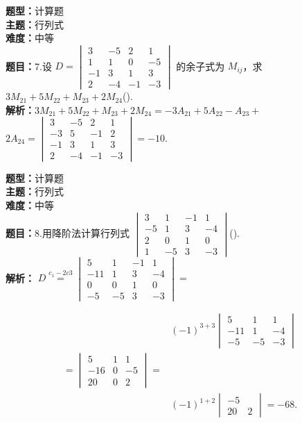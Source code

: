 \documentclass{ctexart}
\newenvironment{question}[5]{%
	\noindent\textbf{题型：}#1\\
	\textbf{主题：}#2\\
	\textbf{难度：}#3\\
	\textbf{题目：}#4\\
	\textbf{解析：}#5\\
	\vspace{1em}
}{}
\begin{document}
	\begin{question}
		{计算题}
		{行列式}
		{中等}
		{7.设 \(D=\begin{vmatrix}3 & -5 & 2 & 1 \\ 1 & 1 & 0 & -5 \\ -1 & 3 & 1 & 3 \\ 2 & -4 & -1 & -3\end{vmatrix}\) 的余子式为 \(M_{ij}\)，求 \(3 M_{21}+5 M_{22}+M_{23}+2 M_{24}\)(\qquad). }
		{\(3 M_{21}+5 M_{22}+M_{23}+2 M_{24}=-3 A_{21}+5 A_{22}-A_{23}+\) \(2 A_{24} =\begin{vmatrix}3 & -5 & 2 & 1 \\ -3 & 5 & -1 & 2 \\ -1 & 3 & 1 & 3 \\ 2 & -4 & -1 & -3\end{vmatrix}=-10\).}
	\end{question}
	
	\begin{question}
		{计算题}
		{行列式}
		{中等}
		{8.用降阶法计算行列式 \(\begin{vmatrix}3 & 1 & -1 & 1 \\ -5 & 1 & 3 & -4 \\ 2 & 0 & 1 & 0 \\ 1 & -5 & 3 & -3\end{vmatrix}\)(\qquad). }
		{ \(D \stackrel{c_1-2 c 3}{=}\begin{vmatrix}5 & 1 & -1 & 1 \\ -11 & 1 & 3 & -4 \\ 0 & 0 & 1 & 0 \\ -5 & -5 & 3 & -3\end{vmatrix}=\)
			
			\[
			\begin{aligned}
				& (-1)^{3+3}\begin{vmatrix}
					5 & 1 & 1 \\
					-11 & 1 & -4 \\
					-5 & -5 & -3
				\end{vmatrix} \\
				=\begin{vmatrix}
					5 & 1 & 1 \\
					-16 & 0 & -5 \\
					20 & 0 & 2
				\end{vmatrix}= \\
				& (-1)^{1+2}\begin{vmatrix}
					-5 \\
					20 & 2
				\end{vmatrix}=-68 .
			\end{aligned}
			\]}
	\end{question}
	
\end{document}
